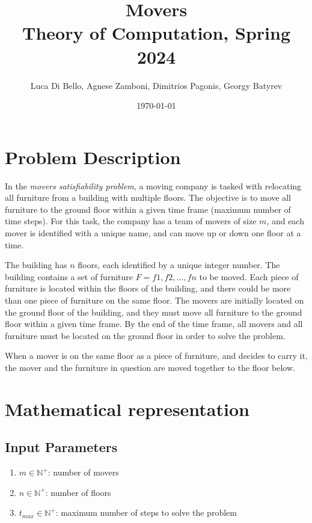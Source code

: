 \documentclass[a4paper, 11pt]{article}
\title{Movers \\[1ex] \large Theory of Computation, Spring 2024}
\author{Luca Di Bello, Agnese Zamboni, Dimitrios Pagonis, Georgy Batyrev}
\date{\today}
\begin{document}
\maketitle
\tableofcontents

\pagebreak

\section{Problem Description}

In the \textit{movers satisfiability problem}, a moving company is tasked with relocating all furniture from a building with multiple floors. The objective is to move all furniture to the ground floor within a given time frame (maximum number of time steps). For this task, the company has a team of movers of size $m$, and each mover is identified with a unique name, and can move up or down one floor at a time.

The building has $n$ floors, each identified by a unique integer number. The building contains a set of furniture $F = {f1,f2,...,fn}$ to be moved. Each piece of furniture is located within the floors of the building, and there could be more than one piece of furniture on the same floor. The movers are initially located on the ground floor of the building, and they must move all furniture to the ground floor within a given time frame. By the end of the time frame, all movers and all furniture must be located on the ground floor in order to solve the problem.

When a mover is on the same floor as a piece of furniture, and decides to carry it, the mover and the furniture in question are moved together to the floor below.

\pagebreak

\section{Mathematical representation}

\subsection{Input Parameters}

\begin{enumerate}
    \item $m \in \mathbb{N}^+$: number of movers
     \item $n \in \mathbb{N}^+$: number of floors
      \item $t_{max} \in \mathbb{N}^+$: maximum number of steps to solve the problem
\end{enumerate}
\end{document}
